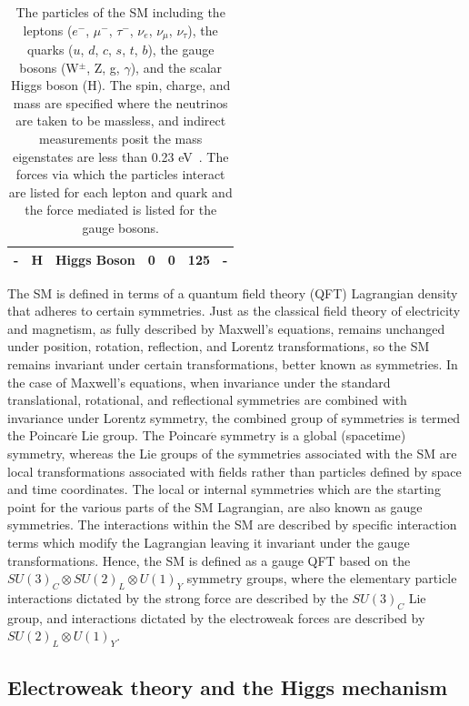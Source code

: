 \begin{table}[!htbp]
{\begin{tabular}{l l l c c c l}
      \hline\hline
      -          & H            & Higgs Boson   & 0   &    0   & 125                    & - \\
      \hline
    \end{tabular}
  }
  \caption{The particles of the SM including the leptons ($e^-$, $\mu^-$, $\tau^-$, $\nu_{e}$, $\nu_{\mu}$, $\nu_{\tau}$), the quarks ($u$, $d$, $c$, $s$, $t$, $b$), the gauge bosons (W$^\pm$, Z, g, $\gamma$), and the scalar Higgs boson (H). The spin, charge, and mass are specified where the neutrinos are taken to be massless, and indirect measurements posit the mass eigenstates are less than 0.23 eV~\cite{PhysRevD.86.010001}. The forces via which the particles interact are listed for each lepton and quark and the force mediated is listed for the gauge bosons.}
  \label{tab:SM}
\end{table}

The SM is defined in terms of a quantum field theory (QFT) Lagrangian density that adheres to certain symmetries. Just as the classical field theory of electricity and magnetism, as fully described by Maxwell's equations, remains unchanged under position, rotation, reflection, and Lorentz transformations, so the SM remains invariant under certain transformations, better known as symmetries. In the case of Maxwell's equations, when invariance under the standard translational, rotational, and reflectional symmetries are combined with invariance under Lorentz symmetry, the combined group of symmetries is termed the Poincar$\acute{\mathrm{e}}$ Lie group. The Poincar$\acute{\mathrm{e}}$ symmetry is a global (spacetime) symmetry, whereas the Lie groups of the symmetries associated with the SM are local transformations associated with fields rather than particles defined by space and time coordinates. The local or internal symmetries which are the starting point for the various parts of the SM Lagrangian, are also known as gauge symmetries. The interactions within the SM are described by specific interaction terms which modify the Lagrangian leaving it invariant under the gauge transformations. Hence, the SM is defined as a gauge QFT based on the $SU(3)_{C}\otimes SU(2)_{L}\otimes U(1)_{Y}$ symmetry groups, where the elementary particle interactions dictated by the strong force are described by the $SU(3)_{C}$ Lie group, and interactions dictated by the electroweak forces are described by $SU(2)_{L}\otimes U(1)_{Y}$.

\subsection{Electroweak theory and the Higgs mechanism}
\label{subsec:EWKHiggs}

